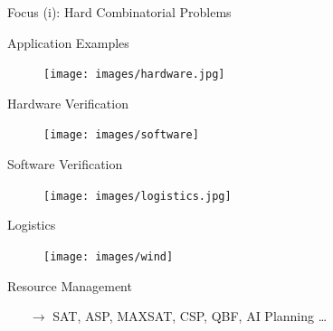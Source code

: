 \begin{frame}[c,fragile]{Focus (i): Hard Combinatorial Problems}

% 

\begin{block}{Application Examples}
\centering
\begin{multicols}{2}

\begin{figure}
\texttt{[image: images/hardware.jpg]}
\end{figure}
\vspace{-1.3em}
Hardware Verification

\begin{figure}
\texttt{[image: images/software]}
\end{figure}
\vspace{-1.3em}
Software Verification

\columnbreak

\begin{figure}
\texttt{[image: images/logistics.jpg]}
\end{figure}
\vspace{-1.3em}
Logistics

\begin{figure}
\texttt{[image: images/wind]}
\end{figure}
\vspace{-1.3em}
Resource Management
\end{multicols}
\end{block}

\pause

\begin{itemize}
  \item[$\to$] SAT, ASP, MAXSAT, CSP, QBF, AI Planning \ldots
\end{itemize}

\end{frame}
